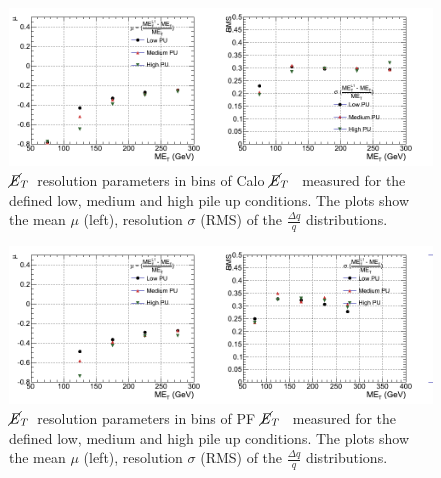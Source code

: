 \begin{figure}[h!]
  \vspace{20pt}
        \centering
        \includegraphics[width=1.0\textwidth]{plots/res_CaloMET_summary.png}
        \caption{$\cancel{E}_{T}$~resolution parameters in bins of Calo $\cancel{E}_{T}$~ measured for the defined low, medium and high pile up conditions. The plots show the mean $\mu$ (left), resolution $\sigma$ (RMS) of the $\frac{\Delta q}{q}$  distributions.}
        \label{fig:calometresultspu}
\end{figure}
\begin{figure}[h!]
  \vspace{20pt}
        \centering
        \includegraphics[width=1.0\textwidth]{plots/res_pfMET_summary.png}
        \caption{$\cancel{E}_{T}$~resolution parameters in bins of PF $\cancel{E}_{T}$~ measured for the defined low, medium and high pile up conditions. The plots show the mean $\mu$ (left), resolution $\sigma$ (RMS) of the $\frac{\Delta q}{q}$  distributions.}
        \label{fig:pfmetresultspu}
\end{figure}


